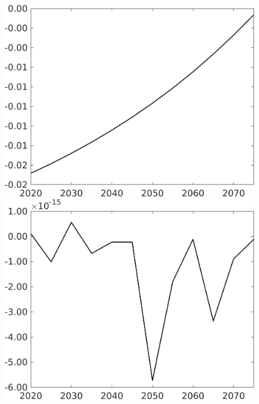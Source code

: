 \begin{figure}[h!!]
\begin{minipage}[]{0.32\textwidth}
	\includegraphics[width=1\textwidth]{../../codding_model/own_basedOnFried/optimalPol_190722_tidiedUp/figures/all_July22/taul_SingleAltPolOPT_NOT_NoTaus_regime3_spillover0_noskill0_sep1_xgrowth0_etaa0.79.png}
\end{minipage}
\begin{minipage}[]{0.32\textwidth}
	\includegraphics[width=1\textwidth]{../../codding_model/own_basedOnFried/optimalPol_190722_tidiedUp/figures/all_July22/taul_SingleAltPolOPT_NOT_NoTaus_regime3_spillover0_noskill0_sep1_xgrowth1_etaa0.79.png}
\end{minipage}
\end{figure} 

